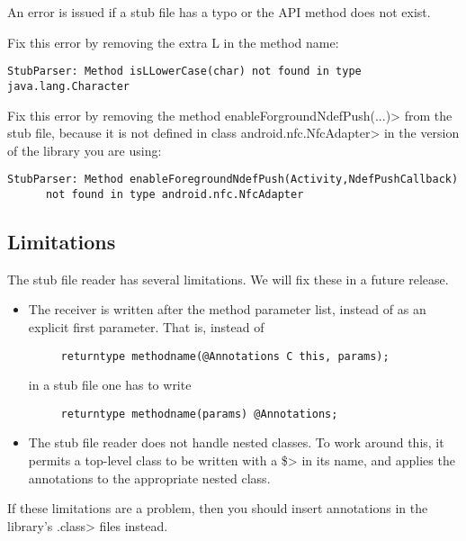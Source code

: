 An error is issued if a stub file has a typo or the API method does not
exist.

Fix this error by removing the extra L in the method name:
\begin{Verbatim}
StubParser: Method isLLowerCase(char) not found in type java.lang.Character
\end{Verbatim}

Fix this error by removing the method \<enableForgroundNdefPush(...)> from
the stub file, because it is not defined in class \<android.nfc.NfcAdapter>
in the version of the library you are using:
\begin{Verbatim}
StubParser: Method enableForegroundNdefPush(Activity,NdefPushCallback) 
      not found in type android.nfc.NfcAdapter
\end{Verbatim}


\subsection{Limitations\label{stub-limitations}}

The stub file reader has several limitations.  We will fix these in a
future release.

\begin{itemize}
\item 
  The receiver is written after the method parameter list, instead of as an
  explicit first parameter.  That is, instead of

\begin{Verbatim}
     returntype methodname(@Annotations C this, params);
\end{Verbatim}

\noindent
in a stub file one has to write

\begin{Verbatim}
     returntype methodname(params) @Annotations;
\end{Verbatim}

\item
  The stub file reader
  does not handle nested classes.  To work around this, it permits a
  top-level class to be written with a \<\$> in its name, and applies the
  annotations to the appropriate nested class.
\end{itemize}

If these limitations are a problem, then you should insert annotations
in the library's \<.class> files instead.



